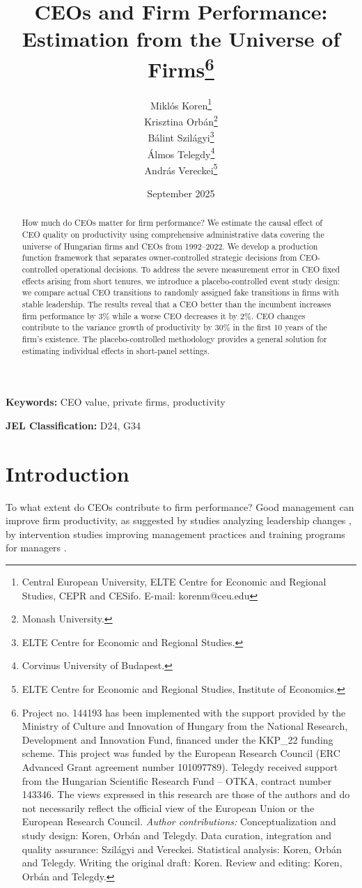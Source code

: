 \documentclass[11pt,a4paper]{article}
\title{CEOs and Firm Performance: Estimation from the Universe of Firms\thanks{Project no. 144193 has been implemented with the support provided by the Ministry of Culture and Innovation of Hungary from the National Research, Development and Innovation Fund, financed under the KKP\_22 funding scheme. This project was funded by the European Research Council (ERC Advanced Grant agreement number 101097789). Telegdy received support from the Hungarian Scientific Research Fund – OTKA, contract number 143346. The views expressed in this research are those of the authors and do not necessarily reflect the official view of the European Union or the European Research Council. \emph{Author contributions:} Conceptualization and study design: Koren, Orbán and Telegdy. Data curation, integration and quality assurance: Szilágyi and Vereckei. Statistical analysis: Koren, Orbán and Telegdy. Writing the original draft: Koren. Review and editing: Koren, Orbán and Telegdy.}}
\author{Miklós Koren\thanks{Central European University, ELTE Centre for Economic and Regional Studies, CEPR and CESifo. E-mail: korenm@ceu.edu} \\
        Krisztina Orbán\thanks{Monash University.} \\
        Bálint Szilágyi\thanks{ELTE Centre for Economic and Regional Studies.} \\
        Álmos Telegdy\thanks{Corvinus University of Budapest.} \\
        András Vereckei\thanks{ELTE Centre for Economic and Regional Studies, Institute of Economics.}}
\date{September 2025}
\begin{document}
\maketitle
\thispagestyle{empty}

\begin{abstract}
How much do CEOs matter for firm performance? We estimate the causal effect of CEO quality on productivity using comprehensive administrative data covering the universe of Hungarian firms and CEOs from 1992--2022. We develop a production function framework that separates owner-controlled strategic decisions from CEO-controlled operational decisions. To address the severe measurement error in CEO fixed effects arising from short tenures, we introduce a placebo-controlled event study design: we compare actual CEO transitions to randomly assigned fake transitions in firms with stable leadership. The results reveal that a CEO better than the incumbent increases firm performance by 3\% while a worse CEO decreases it by 2\%. CEO changes contribute to the variance growth of productivity by 30\% in the first 10 years of the firm's existence. The placebo-controlled methodology provides a general solution for estimating individual effects in short-panel settings.
\end{abstract}

\textbf{Keywords:} CEO value, private firms, productivity

\textbf{JEL Classification:} D24, G34

\clearpage
\setcounter{page}{1}

\section{Introduction}

To what extent do CEOs contribute to firm performance? Good management can improve firm productivity, as suggested by studies analyzing leadership changes \citep{Bertrand2003-io,bennedsen2020ceos,metcalfe2023managers}, by intervention studies improving management practices \citep{bloom2013does} and training programs for managers \citep{mckenzie2021small, bianchigiorcellitraining}.
\end{document}

